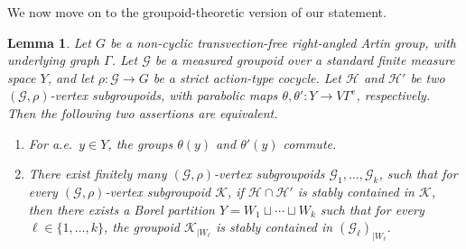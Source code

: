 \documentclass[11pt]{article}
\numberwithin{equation}{section}
\let\mathcal\mathscr
\theoremstyle{plain}
\newtheorem{lemma}[theo]{Lemma}
\theoremstyle{definition}
\let\dunion\sqcup
\newcommand{\calg}{\mathcal{G}}
\newcommand{\calh}{\mathcal{H}}
\newcommand{\calk}{\mathcal{K}}
\begin{document}
We now move on to the groupoid-theoretic version of our statement.

\begin{lemma}\label{lemma:adjacency-groupoids}
Let $G$ be a non-cyclic transvection-free right-angled Artin group, with underlying graph $\Gamma$. Let $\calg$ be a measured groupoid over a standard finite measure space $Y$, and let $\rho:\calg\to G$ be a strict action-type cocycle. Let $\calh$ and $\calh'$ be two $(\calg,\rho)$-vertex subgroupoids, with parabolic maps $\theta,\theta':Y\to V\Gamma^e$, respectively. Then the following two assertions are equivalent.
\begin{enumerate}
\item\label{lemma:adjacency-groupoids1} For a.e.\ $y\in Y$, the groups $\theta(y)$ and $\theta'(y)$ commute.
\item\label{lemma:adjacency-groupoids2} There exist finitely many $(\calg,\rho)$-vertex subgroupoids $\calg_1,\dots,\calg_k$, such that for every $(\calg,\rho)$-vertex subgroupoid $\calk$, if $\calh\cap\calh'$ is stably contained in $\calk$, then there exists a Borel partition $Y=W_1\dunion \cdots\dunion W_k$ such that for every $\ell\in\{1,\dots,k\}$, the groupoid $\calk_{|W_\ell}$ is stably contained in $(\calg_\ell)_{|W_\ell}$.
\end{enumerate}
\end{lemma}
\end{document}
